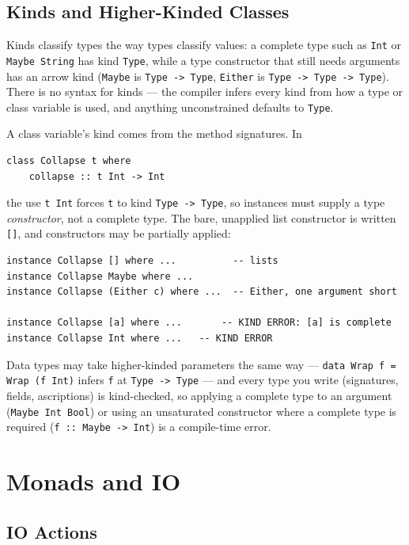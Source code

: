 \documentclass[11pt,a4paper]{article}
\begin{document}
\subsection{Kinds and Higher-Kinded Classes}

Kinds classify types the way types classify values: a complete type
such as \texttt{Int} or \texttt{Maybe String} has kind
\texttt{Type}, while a type constructor that still needs arguments has
an arrow kind (\texttt{Maybe} is \texttt{Type -> Type}, \texttt{Either}
is \texttt{Type -> Type -> Type}). There is no syntax for kinds ---
the compiler infers every kind from how a type or class variable is
used, and anything unconstrained defaults to \texttt{Type}.

A class variable's kind comes from the method signatures. In

\begin{lstlisting}
class Collapse t where
    collapse :: t Int -> Int
\end{lstlisting}

the use \texttt{t Int} forces \texttt{t} to kind
\texttt{Type -> Type}, so instances must supply a type
\emph{constructor}, not a complete type. The bare, unapplied list
constructor is written \texttt{[]}, and constructors may be partially
applied:

\begin{lstlisting}
instance Collapse [] where ...          -- lists
instance Collapse Maybe where ...
instance Collapse (Either c) where ...  -- Either, one argument short

instance Collapse [a] where ...       -- KIND ERROR: [a] is complete
instance Collapse Int where ...   -- KIND ERROR
\end{lstlisting}

Data types may take higher-kinded parameters the same way ---
\texttt{data Wrap f = Wrap (f Int)} infers \texttt{f} at
\texttt{Type -> Type} --- and every type you write (signatures, fields,
ascriptions) is kind-checked, so applying a complete type to an
argument (\texttt{Maybe Int Bool}) or using an unsaturated
constructor where a complete type is required
(\texttt{f :: Maybe -> Int}) is a compile-time error.

\section{Monads and IO}

\subsection{IO Actions}
\end{document}

